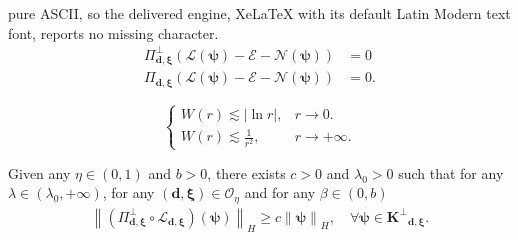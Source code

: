 \documentclass[10pt,a4paper]{amsart}
\begin{document}
pure ASCII, so the delivered engine, XeLaTeX with its default Latin Modern text font, reports no missing character.
 \begin{align}
    \label{vec-1} \Pi^{\perp}_{\bm{d},\bm{\xi}}\left(\bm{\mathcal{L}}(\bm{\psi})-\bm{\mathcal{E}}-\bm{\mathcal{N}}(\bm{\psi})\right)&=0\\
    \label{vec-2}\Pi_{\bm{d},\bm{\xi}}\left(\bm{\mathcal{L}}(\bm{\psi})-\bm{\mathcal{E}}-\bm{\mathcal{N}}(\bm{\psi})\right)&=0.
\end{align}

    \begin{equation}\label{properties-1}
    \begin{cases}
        W(r)\lesssim |\ln{r}|, &r\to 0.\\
        W(r)\lesssim \frac{1}{r^{2}},&r\to +\infty.
    \end{cases}
    \end{equation}

 {\begin{Lem}\label{invert}
 Given any $\eta\in(0,1)$ and $b>0$, there exists $c>0$ and $\lambda_0>0$ such that for any $\lambda \in (\lambda_0,+\infty)$, for any $\left(\bm{d}, \bm{\xi}\right)\in \mathcal{O}_\eta$ and for any $\beta\in (0,b)$ 
    \begin{align*}
        \left\|\left(\Pi^{\perp}_{\bm{d},\bm{\xi}}\circ\bm{\mathcal{L}}_{\bm{d},\bm{\xi}}\right)(\bm{\psi})\right\|_H\geq c\left\|\bm{\psi}\right\|_H, \quad \forall \bm{\psi}\in \bm{K^{\perp}}_{\bm{d},\bm{\xi}}.   \end{align*} 

\end{Lem}}
\end{document}
